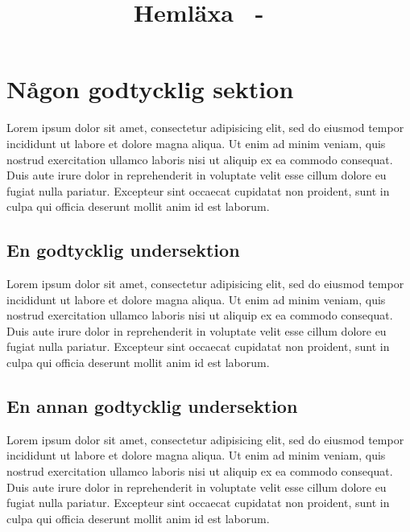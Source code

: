 \documentclass[a4paper,10pt,twoside]{article}
\title{Hemläxa \homeworknumber\ - \course\ \coursename}
\date{\thedate}
\author{\theauthor}
\begin{document}
\maketitle %


\section{Någon godtycklig sektion} %
\label{sec:någon_godtycklig_sektion}
Lorem ipsum dolor sit amet, consectetur adipisicing elit, sed do eiusmod tempor incididunt ut labore et dolore magna aliqua. Ut enim ad minim veniam, quis nostrud exercitation ullamco laboris nisi ut aliquip ex ea commodo consequat. Duis aute irure dolor in reprehenderit in voluptate velit esse cillum dolore eu fugiat nulla pariatur. Excepteur sint occaecat cupidatat non proident, sunt in culpa qui officia deserunt mollit anim id est laborum.

\subsection{En godtycklig undersektion} %
\label{sub:en_godtycklig_undersektion}
Lorem ipsum dolor sit amet, consectetur adipisicing elit, sed do eiusmod tempor incididunt ut labore et dolore magna aliqua. Ut enim ad minim veniam, quis nostrud exercitation ullamco laboris nisi ut aliquip ex ea commodo consequat. Duis aute irure dolor in reprehenderit in voluptate velit esse cillum dolore eu fugiat nulla pariatur. Excepteur sint occaecat cupidatat non proident, sunt in culpa qui officia deserunt mollit anim id est laborum.

\subsection{En annan godtycklig undersektion} %
\label{sub:en_annan_godtycklig_undersektion}
Lorem ipsum dolor sit amet, consectetur adipisicing elit, sed do eiusmod tempor incididunt ut labore et dolore magna aliqua. Ut enim ad minim veniam, quis nostrud exercitation ullamco laboris nisi ut aliquip ex ea commodo consequat. Duis aute irure dolor in reprehenderit in voluptate velit esse cillum dolore eu fugiat nulla pariatur. Excepteur sint occaecat cupidatat non proident, sunt in culpa qui officia deserunt mollit anim id est laborum.
\end{document}
